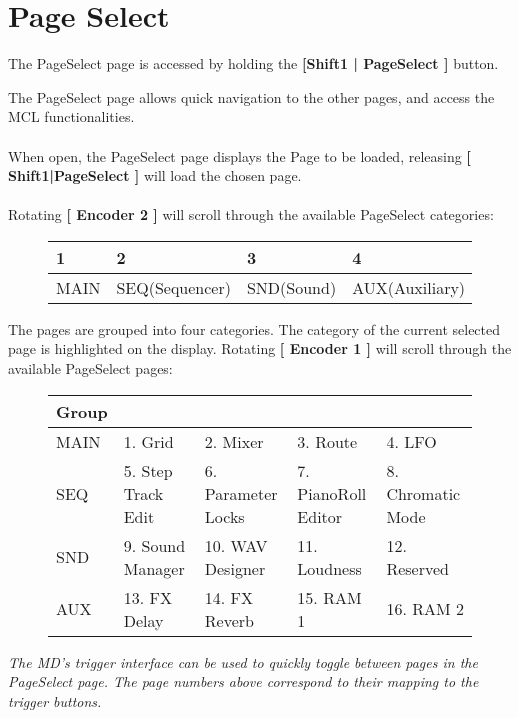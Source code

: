 \chapter{Page Select}
The PageSelect page is accessed by holding the \textbf{[Shift1 | PageSelect ]} button.

The PageSelect page allows quick navigation to the other pages, and access the MCL functionalities.
\\
\\
When open, the PageSelect page displays the Page to be loaded, releasing \textbf{[ Shift1|PageSelect ]} will load
the chosen page.
\\
\\
Rotating \textbf{[ Encoder 2 ]} will scroll through the available PageSelect categories:

\begin{figure}[h]
    \begin{tabular}{|l|l|l|l|}
    \hline
    \rowcolor[HTML]{C0C0C0} 
    1    & 2              & 3          & 4              \\ \hline
    MAIN & SEQ(Sequencer) & SND(Sound) & AUX(Auxiliary) \\ \hline
    \end{tabular}
\end{figure}

The pages are grouped into four categories. The category of the current selected page is highlighted on the display.
Rotating \textbf{[ Encoder 1 ]} will scroll through the available PageSelect pages:

\begin{figure}[h]
    \begin{tabular}{|l|l|l|l|l|}
    \hline
    \rowcolor[HTML]{C0C0C0} 
    {\color[HTML]{000000} Group} & \multicolumn{4}{l|}{\cellcolor[HTML]{C0C0C0}{\color[HTML]{000000} Pages}}      \\ \hline
    MAIN                              & 1. Grid            & 2. Mixer         & 3. Route           & 4. LFO            \\ \hline
    SEQ                               & 5. Step Track Edit & 6. Parameter Locks & 7. PianoRoll Editor & 8. Chromatic Mode \\ \hline
    SND                               & 9. Sound Manager   & 10. WAV Designer & 11. Loudness       & 12. Reserved      \\ \hline
    AUX                               & 13. FX Delay       & 14. FX Reverb    & 15. RAM 1          & 16. RAM 2         \\ \hline
    \end{tabular}
\end{figure}

\textit{The MD's trigger interface can be used to quickly toggle between pages in the PageSelect page. The page numbers above correspond to their mapping to the trigger buttons. }






